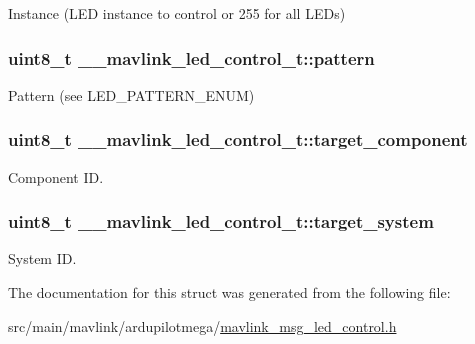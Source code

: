 Instance (L\+E\+D instance to control or 255 for all L\+E\+Ds) 

\hypertarget{struct____mavlink__led__control__t_a74eea064ff503c2144ac3749592ddb6f}{
\subsubsection[{pattern}]{\setlength{\rightskip}{0pt plus 5cm}uint8\+\_\+t \+\_\+\+\_\+mavlink\+\_\+led\+\_\+control\+\_\+t\+::pattern}}\label{struct____mavlink__led__control__t_a74eea064ff503c2144ac3749592ddb6f}


Pattern (see L\+E\+D\+\_\+\+P\+A\+T\+T\+E\+R\+N\+\_\+\+E\+N\+U\+M) 

\hypertarget{struct____mavlink__led__control__t_a42de323f5b5693976f3591d5494c5dc6}{
\subsubsection[{target\+\_\+component}]{\setlength{\rightskip}{0pt plus 5cm}uint8\+\_\+t \+\_\+\+\_\+mavlink\+\_\+led\+\_\+control\+\_\+t\+::target\+\_\+component}}\label{struct____mavlink__led__control__t_a42de323f5b5693976f3591d5494c5dc6}


Component I\+D. 

\hypertarget{struct____mavlink__led__control__t_a9e1be304a169044dcc57c7c5fe1045f7}{
\subsubsection[{target\+\_\+system}]{\setlength{\rightskip}{0pt plus 5cm}uint8\+\_\+t \+\_\+\+\_\+mavlink\+\_\+led\+\_\+control\+\_\+t\+::target\+\_\+system}}\label{struct____mavlink__led__control__t_a9e1be304a169044dcc57c7c5fe1045f7}


System I\+D. 



The documentation for this struct was generated from the following file\+:\begin{DoxyCompactItemize}
\item 
src/main/mavlink/ardupilotmega/\hyperlink{mavlink__msg__led__control_8h}{mavlink\+\_\+msg\+\_\+led\+\_\+control.\+h}\end{DoxyCompactItemize}

